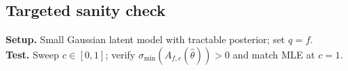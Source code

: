 \documentclass[twoside,11pt]{article}
\begin{document}
\subsection{Targeted sanity check}
\textbf{Setup.} Small Gaussian latent model with tractable posterior; set $q=f$. \\
\textbf{Test.} Sweep $c\in[0,1]$; verify $\sigma_{\min}(A_{f,c}(\hat\theta))>0$ and match MLE at $c{=}1$.





\newpage
 
\newpage
\appendix


\end{document}
